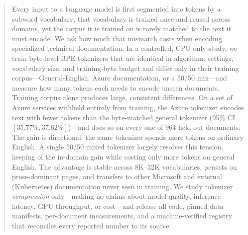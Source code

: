 \begin{abstract}
Every input to a language model is first segmented into tokens by a subword
vocabulary; that vocabulary is trained once and reused across domains, yet the
corpus it is trained on is rarely matched to the text it must encode. We ask how
much that mismatch costs when encoding specialized technical documentation. In a
controlled, CPU-only study, we train byte-level BPE tokenizers that are identical
in algorithm, settings, vocabulary size, and training-byte budget and differ only
in their training corpus---General-English, Azure documentation, or a 50/50
mix---and measure how many tokens each needs to encode unseen documents. Training
corpus alone produces large, consistent differences. On a set of Azure services
withheld entirely from training, the Azure tokenizer encodes text with
 fewer tokens than the byte-matched general tokenizer (95\% CI
$[35.77\%, 37.62\%]$)---and does so on every one of 964 held-out documents. The
gain is directional: the same tokenizer spends  more tokens on
ordinary English. A single 50/50 mixed tokenizer largely resolves this tension,
keeping  of the in-domain gain while costing only  more
tokens on general English. The advantage is stable across 8K--32K vocabularies,
persists on prose-dominant pages, and transfers to other Microsoft and external
(Kubernetes) documentation never seen in training. We study tokenizer
\emph{compression} only---making no claims about model quality, inference latency,
GPU throughput, or cost---and release all code, pinned data manifests,
per-document measurements, and a machine-verified registry that reconciles every
reported number to its source.
\end{abstract}
